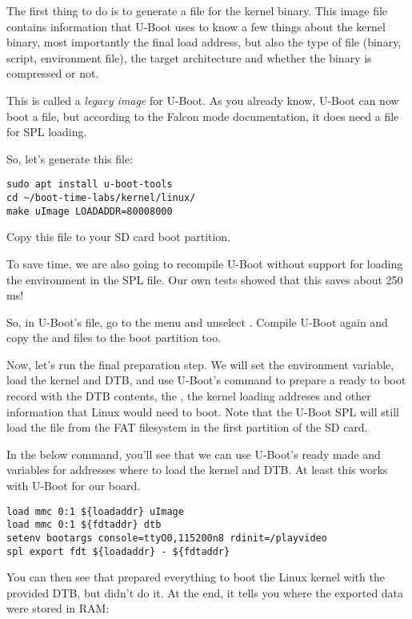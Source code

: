 The first thing to do is to generate a  file for the kernel
binary. This image file contains information that U-Boot uses to know a
few things about the kernel binary, most importantly the final load
address, but also the type of file (binary, script, environment file),
the target architecture and whether the binary is compressed or not.

This is called a {\em legacy image} for U-Boot. As you already know,
U-Boot can now boot a  file, but according to the Falcon
mode documentation, it does need a  file for SPL loading.

So, let's generate this file:
\begin{verbatim}
sudo apt install u-boot-tools
cd ~/boot-time-labs/kernel/linux/
make uImage LOADADDR=80008000
\end{verbatim}

Copy this  file to your SD card boot partition.

To save time, we are also going to recompile U-Boot without support for
loading the environment in the SPL file. Our own tests showed that this
saves about 250 ms!

So, in U-Boot's  file, go to the 
menu and unselect . Compile U-Boot again
and copy the  and  files to the boot
partition too.

Now, let's run the final preparation step. We will set the
 environment variable, load the kernel and DTB, and
use U-Boot's  command to prepare a ready to boot record
with the DTB contents, the , the kernel loading addreses
and other information that Linux would need to boot. Note that the
U-Boot SPL will still load the  file from the FAT
filesystem in the first partition of the SD card.

In the below command, you'll see that we can use U-Boot's ready made
 and  variables for addresses where to load
the kernel and DTB. At least this works with U-Boot for our board.

\begin{verbatim}
load mmc 0:1 ${loadaddr} uImage
load mmc 0:1 ${fdtaddr} dtb
setenv bootargs console=ttyO0,115200n8 rdinit=/playvideo
spl export fdt ${loadaddr} - ${fdtaddr}
\end{verbatim}

You can then see that  prepared everything to boot the
Linux kernel with the provided DTB, but didn't do it. At the end, it
tells you where the exported data were stored in RAM:

